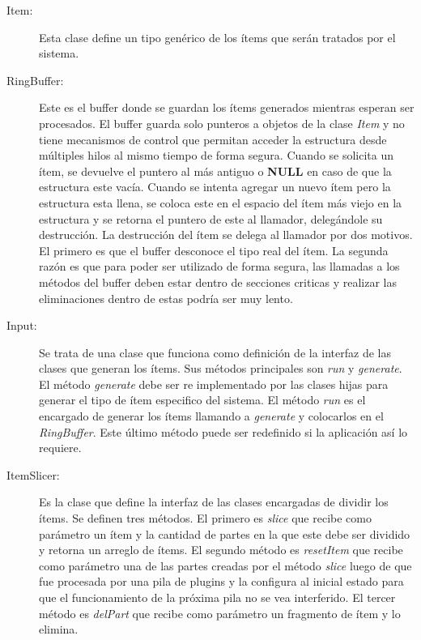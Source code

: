 \begin{description}

	\item[Item:] Esta clase define un tipo genérico de los ítems que serán
		tratados por el sistema.

	\item[RingBuffer:] Este es el buffer donde se guardan los ítems
		generados mientras esperan ser procesados. El buffer guarda solo
		punteros a objetos de la clase \emph{Item} y no tiene mecanismos
		de control que permitan acceder la estructura desde múltiples
		hilos al mismo tiempo de forma segura. Cuando se solicita un
		ítem, se devuelve el puntero al más antiguo o \textbf{NULL} en
		caso de que la estructura este vacía. Cuando se intenta agregar
		un nuevo ítem pero la estructura esta llena, se coloca este en
		el espacio del ítem más viejo en la estructura y se retorna el
		puntero de este al llamador, delegándole su destrucción. La
		destrucción del ítem se delega al llamador por dos motivos. El
		primero es que el buffer desconoce el tipo real del ítem. La
		segunda razón es que para poder ser utilizado de forma segura,
		las llamadas a los métodos del buffer deben estar dentro de
		secciones criticas y realizar las eliminaciones dentro de estas
		podría ser muy lento.

	\item[Input:] Se trata de una clase que funciona como definición de la
		interfaz de las clases que generan los ítems. Sus métodos
		principales son \emph{run} y \emph{generate}. El método
		\emph{generate} debe ser re implementado por las clases hijas
		para generar el tipo de ítem especifico del sistema. El método
		\emph{run} es el encargado de generar los ítems llamando a
		\emph{generate} y colocarlos en el \emph{RingBuffer}. Este
		último método puede ser redefinido si la aplicación así lo
		requiere.

	\item[ItemSlicer:] Es la clase que define la interfaz de las clases
		encargadas de dividir los ítems. Se definen tres métodos. El
		primero es \emph{slice} que recibe como parámetro un ítem y la
		cantidad de partes en la que este debe ser dividido y retorna un
		arreglo de ítems. El segundo método es \emph{resetItem} que
		recibe como parámetro una de las partes creadas por el método
		\emph{slice} luego de que fue procesada por una pila de plugins
		y la configura al inicial estado para que el funcionamiento de
		la próxima pila no se vea interferido. El tercer método es
		\emph{delPart} que recibe como parámetro un fragmento de ítem y
		lo elimina.


\end{description}
